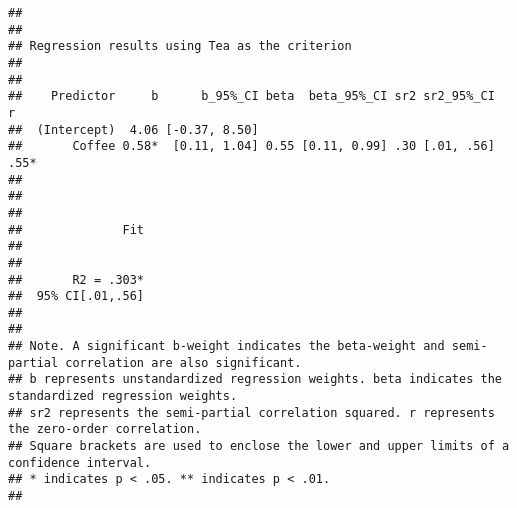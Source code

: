 \documentclass[
]{article}
\newenvironment{Shaded}{\begin{snugshade}}{\end{snugshade}}
\newcommand{\AttributeTok}[1]{\textcolor[rgb]{0.13,0.29,0.53}{#1}}
\newcommand{\DecValTok}[1]{\textcolor[rgb]{0.00,0.00,0.81}{#1}}
\newcommand{\FunctionTok}[1]{\textcolor[rgb]{0.13,0.29,0.53}{\textbf{#1}}}
\newcommand{\NormalTok}[1]{#1}
\newcommand{\OtherTok}[1]{\textcolor[rgb]{0.56,0.35,0.01}{#1}}
\newcommand{\SpecialCharTok}[1]{\textcolor[rgb]{0.81,0.36,0.00}{\textbf{#1}}}
\newcommand{\StringTok}[1]{\textcolor[rgb]{0.31,0.60,0.02}{#1}}
\begin{document}
\begin{verbatim}
## 
## 
## Regression results using Tea as the criterion
##  
## 
##    Predictor     b      b_95%_CI beta  beta_95%_CI sr2 sr2_95%_CI    r
##  (Intercept)  4.06 [-0.37, 8.50]                                      
##       Coffee 0.58*  [0.11, 1.04] 0.55 [0.11, 0.99] .30 [.01, .56] .55*
##                                                                       
##                                                                       
##                                                                       
##              Fit
##                 
##                 
##       R2 = .303*
##  95% CI[.01,.56]
##                 
## 
## Note. A significant b-weight indicates the beta-weight and semi-partial correlation are also significant.
## b represents unstandardized regression weights. beta indicates the standardized regression weights. 
## sr2 represents the semi-partial correlation squared. r represents the zero-order correlation.
## Square brackets are used to enclose the lower and upper limits of a confidence interval.
## * indicates p < .05. ** indicates p < .01.
## 
\end{verbatim}

\begin{Shaded}
\end{Shaded}
\end{document}
